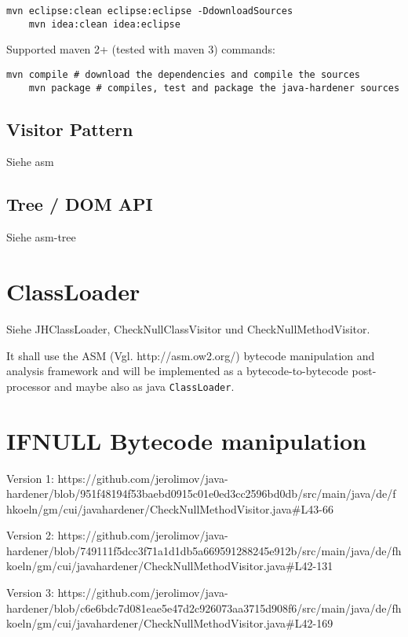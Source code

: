 \begin{lstlisting}[basicstyle=\ttfamily,backgroundcolor=\color{source}]
	mvn eclipse:clean eclipse:eclipse -DdownloadSources
	mvn idea:clean idea:eclipse
\end{lstlisting}

Supported maven 2+ (tested with maven 3) commands:

\begin{lstlisting}[basicstyle=\ttfamily,backgroundcolor=\color{source}]
	mvn compile # download the dependencies and compile the sources
	mvn package # compiles, test and package the java-hardener sources
\end{lstlisting}

\vspace{0.3cm}


\subsection{Visitor Pattern}

Siehe asm

\subsection{Tree / DOM API}

Siehe asm-tree

\section{ClassLoader}

Siehe JHClassLoader, CheckNullClassVisitor und CheckNullMethodVisitor.

It shall use the ASM (Vgl. http://asm.ow2.org/) bytecode manipulation and analysis framework
and will be implemented as a bytecode-to-bytecode post-processor and maybe also as java \texttt{ClassLoader}.


\section{IFNULL Bytecode manipulation}

Version 1: https://github.com/jerolimov/java-hardener/blob/951f48194f53baebd0915c01e0ed3cc2596bd0db/src/main/java/de/fhkoeln/gm/cui/javahardener/CheckNullMethodVisitor.java\#L43-66

Version 2: https://github.com/jerolimov/java-hardener/blob/749111f5dcc3f71a1d1db5a669591288245e912b/src/main/java/de/fhkoeln/gm/cui/javahardener/CheckNullMethodVisitor.java\#L42-131

Version 3: https://github.com/jerolimov/java-hardener/blob/c6e6bdc7d081eae5e47d2c926073aa3715d908f6/src/main/java/de/fhkoeln/gm/cui/javahardener/CheckNullMethodVisitor.java\#L42-169







